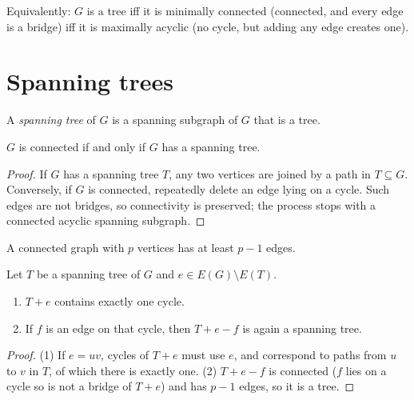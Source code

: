 Equivalently: $G$ is a tree iff it is minimally connected (connected, and every edge is a bridge)
iff it is maximally acyclic (no cycle, but adding any edge creates one).

\section{Spanning trees}

\begin{definition}
A \emph{spanning tree} of $G$ is a spanning subgraph of $G$ that is a tree.
\end{definition}

\begin{theorem}
$G$ is connected if and only if $G$ has a spanning tree.
\end{theorem}
\begin{proof}
If $G$ has a spanning tree $T$, any two vertices are joined by a path in $T \subseteq G$.
Conversely, if $G$ is connected, repeatedly delete an edge lying on a cycle. Such edges are not
bridges, so connectivity is preserved; the process stops with a connected acyclic spanning
subgraph.
\end{proof}

\begin{corollary}
A connected graph with $p$ vertices has at least $p - 1$ edges.
\end{corollary}

\begin{lemma}
Let $T$ be a spanning tree of $G$ and $e \in E(G) \setminus E(T)$.
\begin{enumerate}
  \item $T + e$ contains exactly one cycle.
  \item If $f$ is an edge on that cycle, then $T + e - f$ is again a spanning tree.
\end{enumerate}
\end{lemma}
\begin{proof}
(1) If $e = uv$, cycles of $T + e$ must use $e$, and correspond to paths from $u$ to $v$ in $T$,
of which there is exactly one. (2) $T + e - f$ is connected ($f$ lies on a cycle so is not a
bridge of $T + e$) and has $p - 1$ edges, so it is a tree.
\end{proof}

